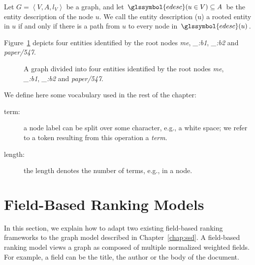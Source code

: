 \begin{definition}
Let $G = \left\langle V, A, l_V \right\rangle$ be a graph, and let $\glssymbol{edesc}(u \in V) \subseteq A$ be the entity description of the node $u$. We call the entity description (u) a rooted entity in $u$ if and only if there is a path from $u$ to every node in $\glssymbol{edesc}(u)$.
\end{definition}

Figure~\ref{fig:entities} depicts four entities identified by the root nodes \emph{me}, \emph{\_:b1}, \emph{\_:b2} and \emph{paper/547}.

\begin{figure}
	\centering
	\caption{A graph divided into four entities identified by the root nodes \emph{me}, \emph{\_:b1}, \emph{\_:b2} and \emph{paper/547}.}
	\label{fig:entities}
\end{figure}

We define here some vocabulary used in the rest of the chapter:
\begin{description}
	\item[term:] a node label can be split over some character, e.g., a white space; we refer to a token resulting from this operation a \emph{term}.
	\item[length:] the length denotes the number of terms, e.g., in a node.
\end{description}

\section{Field-Based Ranking Models}
\label{sec:ranking-wod}

In this section, we explain how to adapt two existing field-based ranking frameworks to the graph model described in Chapter~\ref{chap:ssd}.
A field-based ranking model views a graph as composed of multiple normalized weighted fields. For example, a field can be the title, the author or the body of the document.\\

